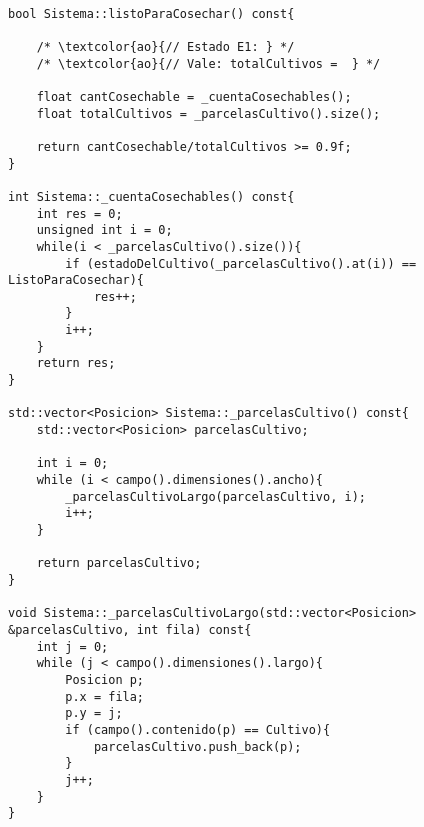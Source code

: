 \begin{lstlisting}

bool Sistema::listoParaCosechar() const{
   
    /* \textcolor{ao}{// Estado E1: } */
    /* \textcolor{ao}{// Vale: totalCultivos =  } */
	   
    float cantCosechable = _cuentaCosechables();
    float totalCultivos = _parcelasCultivo().size();
    
    return cantCosechable/totalCultivos >= 0.9f;
}

int Sistema::_cuentaCosechables() const{
    int res = 0;
    unsigned int i = 0;
    while(i < _parcelasCultivo().size()){
        if (estadoDelCultivo(_parcelasCultivo().at(i)) == ListoParaCosechar){
            res++;
        }
        i++;
    }
    return res;
}

std::vector<Posicion> Sistema::_parcelasCultivo() const{
    std::vector<Posicion> parcelasCultivo;

    int i = 0;
    while (i < campo().dimensiones().ancho){
        _parcelasCultivoLargo(parcelasCultivo, i);
        i++;
    }

    return parcelasCultivo;
}

void Sistema::_parcelasCultivoLargo(std::vector<Posicion> &parcelasCultivo, int fila) const{
    int j = 0;
    while (j < campo().dimensiones().largo){
        Posicion p;
        p.x = fila;
        p.y = j;
        if (campo().contenido(p) == Cultivo){
            parcelasCultivo.push_back(p);
        }
        j++;
    }
}


\end{lstlisting}